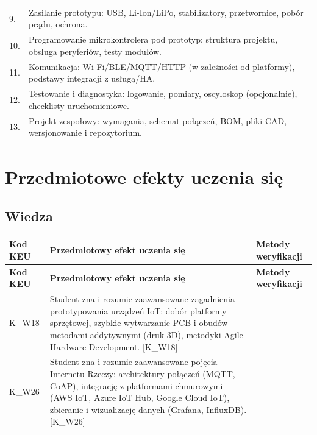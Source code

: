 \documentclass[12pt, a4paper]{article}
\newcommand{\thdrule}{\noalign{\global\setlength{\extrarowheight}{0pt}}}
\newcommand{\thdend}{\noalign{\global\setlength{\extrarowheight}{3pt}}}
\begin{document}
{\begin{longtable}{m{1.5cm}m{14.5cm}}
  \rowcolor{tableRowLight} 9. & Zasilanie prototypu: USB, Li-Ion/LiPo, stabilizatory, przetwornice, pobór prądu, ochrona. \\
  \rowcolor{tableRowAlt} 10. & Programowanie mikrokontrolera pod prototyp: struktura projektu, obsługa peryferiów, testy modułów. \\
  \rowcolor{tableRowLight} 11. & Komunikacja: Wi-Fi/BLE/MQTT/HTTP (w zależności od platformy), podstawy integracji z usługą/HA. \\
  \rowcolor{tableRowAlt} 12. & Testowanie i diagnostyka: logowanie, pomiary, oscyloskop (opcjonalnie), checklisty uruchomieniowe. \\
  \rowcolor{tableRowLight} 13. & Projekt zespołowy: wymagania, schemat połączeń, BOM, pliki CAD, wersjonowanie i repozytorium. \\
\bottomrule
\end{longtable}}

\section{Przedmiotowe efekty uczenia się}

\subsection*{Wiedza}
{\scriptsize
\begin{longtable}{m{1.6cm}m{9.0cm}m{4.2cm}}
\thdrule\toprule
\rowcolor{pjatkRed} {\color{white}\footnotesize\textbf{\vphantom{Ag}Kod KEU}} & {\color{white}\footnotesize\textbf{\vphantom{Ag}Przedmiotowy efekt uczenia się}} & {\color{white}\footnotesize\textbf{\vphantom{Ag}Metody weryfikacji}} \\
\midrule\thdend
\endfirsthead
\thdrule\toprule
\rowcolor{pjatkRed} {\color{white}\footnotesize\textbf{\vphantom{Ag}Kod KEU}} & {\color{white}\footnotesize\textbf{\vphantom{Ag}Przedmiotowy efekt uczenia się}} & {\color{white}\footnotesize\textbf{\vphantom{Ag}Metody weryfikacji}} \\
\midrule\thdend
\endhead
  \rowcolor{tableRowLight} K\_W18 & Student zna i rozumie zaawansowane zagadnienia prototypowania urządzeń IoT: dobór platformy sprzętowej, szybkie wytwarzanie PCB i obudów metodami addytywnymi (druk 3D), metodyki Agile Hardware Development. {[}K\_W18{]} &  \\
  \rowcolor{tableRowAlt} K\_W26 & Student zna i rozumie zaawansowane pojęcia Internetu Rzeczy: architektury połączeń (MQTT, CoAP), integrację z platformami chmurowymi (AWS IoT, Azure IoT Hub, Google Cloud IoT), zbieranie i wizualizację danych (Grafana, InfluxDB). {[}K\_W26{]} &  \\
\bottomrule
\end{longtable}}
\end{document}
